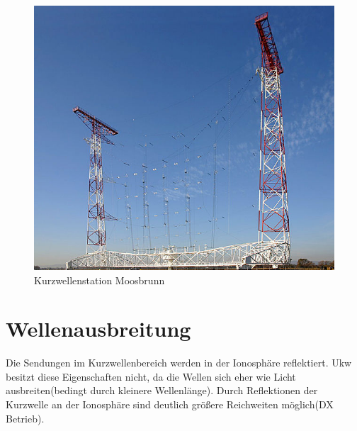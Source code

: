 
{\bfseries\Huge{}}
\begin{figure}
    \includegraphics[]{assets/640px-Moosbrunn_SW_Antenna}
    \caption{Kurzwellenstation Moosbrunn}  
\end{figure}        
\newpage
\part[]{Wellenausbreitung}

    Die Sendungen im Kurzwellenbereich werden in der Ionosphäre reflektiert. 
    Ukw besitzt diese Eigenschaften nicht, da die Wellen sich eher wie Licht ausbreiten(bedingt durch kleinere Wellenlänge). Durch Reflektionen der Kurzwelle an der Ionosphäre
    sind deutlich größere Reichweiten möglich(DX Betrieb).
    \vspace{0.1cm}

